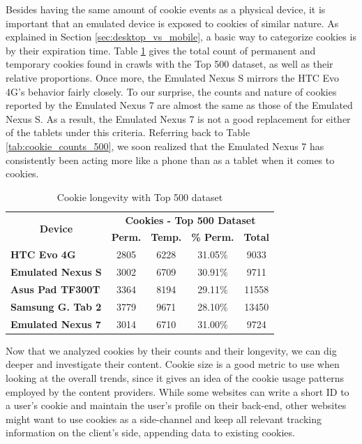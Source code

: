 \documentclass{acm_proc_article-sp}
\begin{document}
Besides having the same amount of cookie events as a physical device, it is important that an emulated device is exposed to cookies of similar nature. As explained in Section \ref{sec:desktop_vs_mobile}, a basic way to categorize cookies is by their expiration time. Table \ref{tab:cookie_longevity} gives the total count of permanent and temporary cookies found in crawls with the Top 500 dataset, as well as their relative proportions. Once more, the Emulated Nexus S mirrors the HTC Evo 4G's behavior fairly closely. To our surprise, the counts and nature of cookies reported by the Emulated Nexus 7 are almost the same as those of the Emulated Nexus S. As a result, the Emulated Nexus 7 is not a good replacement for either of the tablets under this criteria. Referring back to Table \ref{tab:cookie_counts_500}, we soon realized that the Emulated Nexus 7 has consistently been acting more like a phone than as a tablet when it comes to cookies.


\begin{table}[htbp]
  \centering
  \caption{Cookie longevity with Top 500 dataset}
    \begin{tabular}{|c|c|c|c|c|}
    \hline
    \multicolumn{1}{|c|}{\multirow{2}[4]{*}{\textbf{Device}}} & \multicolumn{4}{|c|}{\textbf{Cookies - Top 500 Dataset}} \\ \cline{2-5}
    \multicolumn{1}{|c|}{} & \textbf{Perm.} & \textbf{Temp.} & \textbf{\% Perm.} & \textbf{Total} \\ \hline
    \multicolumn{1}{|l|}{\textbf{HTC Evo 4G}} & 2805  & 6228  & 31.05\% & 9033 \\
    \multicolumn{1}{|l|}{\textbf{Emulated Nexus S}} & 3002  & 6709  & 30.91\% & 9711 \\
    \multicolumn{1}{|l|}{\textbf{Asus Pad TF300T}} & 3364  & 8194  & 29.11\% & 11558 \\
    \multicolumn{1}{|l|}{\textbf{Samsung G. Tab 2}} & 3779  & 9671  & 28.10\% & 13450 \\
    \multicolumn{1}{|l|}{\textbf{Emulated Nexus 7}} & 3014  & 6710  & 31.00\% & 9724 \\ \hline
    \end{tabular}%
  \label{tab:cookie_longevity}%
\end{table}%

Now that we analyzed cookies by their counts and their longevity, we can dig deeper and investigate their content. Cookie size is a good metric to use when looking at the overall trends, since it gives an idea of the cookie usage patterns employed by the content providers. While some websites can write a short ID to a user's cookie and maintain the user's profile on their back-end, other websites might want to use cookies as a side-channel and keep all relevant tracking information on the client's side, appending data to existing cookies.
\end{document}
